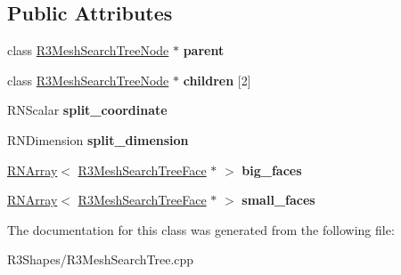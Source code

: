 \subsection*{Public Attributes}
\begin{DoxyCompactItemize}
\item 
class \hyperlink{class_r3_mesh_search_tree_node}{R3\+Mesh\+Search\+Tree\+Node} $\ast$ {\bfseries parent}\hypertarget{class_r3_mesh_search_tree_node_ae258a8c90492309db94a33d9113746fe}{}\label{class_r3_mesh_search_tree_node_ae258a8c90492309db94a33d9113746fe}

\item 
class \hyperlink{class_r3_mesh_search_tree_node}{R3\+Mesh\+Search\+Tree\+Node} $\ast$ {\bfseries children} \mbox{[}2\mbox{]}\hypertarget{class_r3_mesh_search_tree_node_a6957d735c82657357a92c7fc820a1298}{}\label{class_r3_mesh_search_tree_node_a6957d735c82657357a92c7fc820a1298}

\item 
R\+N\+Scalar {\bfseries split\+\_\+coordinate}\hypertarget{class_r3_mesh_search_tree_node_a3bf51181a7f93f3f5a3861b41f05a1b5}{}\label{class_r3_mesh_search_tree_node_a3bf51181a7f93f3f5a3861b41f05a1b5}

\item 
R\+N\+Dimension {\bfseries split\+\_\+dimension}\hypertarget{class_r3_mesh_search_tree_node_a75dddc1e3524f88c65fccf71b1f35991}{}\label{class_r3_mesh_search_tree_node_a75dddc1e3524f88c65fccf71b1f35991}

\item 
\hyperlink{class_r_n_array}{R\+N\+Array}$<$ \hyperlink{class_r3_mesh_search_tree_face}{R3\+Mesh\+Search\+Tree\+Face} $\ast$ $>$ {\bfseries big\+\_\+faces}\hypertarget{class_r3_mesh_search_tree_node_a04d4919ea199360c25a740ab88ea436c}{}\label{class_r3_mesh_search_tree_node_a04d4919ea199360c25a740ab88ea436c}

\item 
\hyperlink{class_r_n_array}{R\+N\+Array}$<$ \hyperlink{class_r3_mesh_search_tree_face}{R3\+Mesh\+Search\+Tree\+Face} $\ast$ $>$ {\bfseries small\+\_\+faces}\hypertarget{class_r3_mesh_search_tree_node_a28861a50c9ca267ded5d7efd93fe9ec2}{}\label{class_r3_mesh_search_tree_node_a28861a50c9ca267ded5d7efd93fe9ec2}

\end{DoxyCompactItemize}


The documentation for this class was generated from the following file\+:\begin{DoxyCompactItemize}
\item 
R3\+Shapes/R3\+Mesh\+Search\+Tree.\+cpp\end{DoxyCompactItemize}
